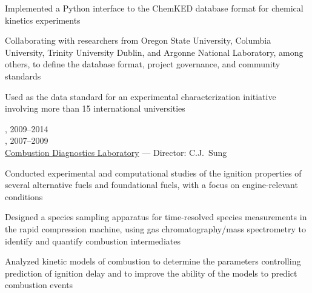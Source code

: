 \begin{innerlist}
    \item Implemented a Python interface to the ChemKED database format for chemical kinetics experiments
    \item Collaborating with researchers from Oregon State University, Columbia University, Trinity University Dublin, and Argonne National Laboratory, among others, to define the database format, project governance, and community standards
    \item Used as the data standard for an experimental characterization initiative involving more than 15 international universities
\end{innerlist}




\vspace{\baselineskip}

,  \hfill 2009--2014\\
,  \hfill 2007--2009\\
\href{http://combdiaglab.engr.uconn.edu}{Combustion Diagnostics Laboratory} --- Director: C.J.\ Sung

\begin{innerlist}
    \item Conducted experimental and computational studies of the ignition
    properties of several alternative fuels and foundational fuels, with
    a focus on engine-relevant conditions
    \item Designed a species sampling apparatus for time-resolved
    species measurements in the rapid compression machine, using gas
    chromatography/mass spectrometry to identify and quantify
    combustion intermediates
    \item Analyzed kinetic models of combustion to determine the parameters
    controlling prediction of ignition delay and to improve the ability of
    the models to predict combustion events
\end{innerlist}

